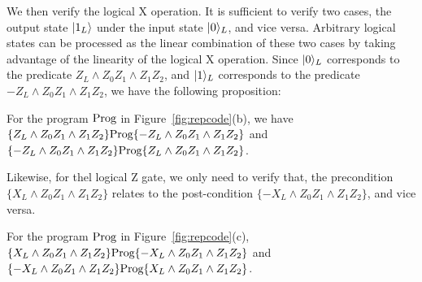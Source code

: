 We then verify the logical X operation.
It is sufficient to verify two cases, the output state $\vert 1_L \rangle$ under the input state $\vert 0 \rangle_L$, and vice versa. Arbitrary logical states can be processed as the linear combination of these two cases by taking advantage of the linearity of the logical X operation.
Since $\vert 0 \rangle_L$ corresponds to the predicate $Z_L\wedge Z_0Z_1 \wedge Z_1Z_2$, and $\vert 1 \rangle_L$ corresponds to the predicate $-Z_L\wedge Z_0Z_1 \wedge Z_1Z_2$, we have the following proposition: \nothmskip
\begin{proposition}
For the program $\text{Prog}$ in Figure~\ref{fig:repcode}(b), we have $\{Z_L\wedge Z_0Z_1\wedge Z_1Z_2\}\text{Prog}\{-Z_L\wedge Z_0Z_1\wedge Z_1Z_2\}$ and $\{-Z_L\wedge Z_0Z_1\wedge Z_1Z_2\}\text{Prog}\{Z_L\wedge Z_0Z_1\wedge Z_1Z_2\}$.
\end{proposition} \nothmskip
{}

Likewise, for thel logical Z gate, we only need to verify that, the precondition $\{X_L\wedge Z_0Z_1\wedge Z_1Z_2\}$ relates to the post-condition $\{-X_L\wedge Z_0Z_1 \wedge Z_1Z_2\}$, and vice versa. %
\nothmskip
\begin{proposition}
For the program $\text{Prog}$ in Figure~\ref{fig:repcode}(c), $\{X_L\wedge Z_0Z_1\wedge Z_1Z_2\}\text{Prog}\{-X_L\wedge Z_0Z_1\wedge Z_1Z_2\}$ and $\{-X_L\wedge Z_0Z_1\wedge Z_1Z_2\}\text{Prog}\{X_L\wedge Z_0Z_1\wedge Z_1Z_2\}$.
\end{proposition} \nothmskip
{}


